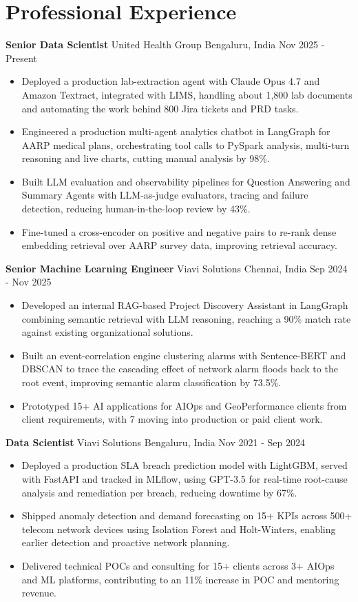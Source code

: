 \documentclass[10pt,a4paper]{article}
\newcommand{\role}[4]{\textbf{#1} \textbar{} #2 \hfill #3 \textbar{} #4\par}
\begin{document}
\section{Professional Experience}
\role{Senior Data Scientist}{United Health Group}{Bengaluru, India}{Nov 2025 - Present}
\begin{itemize}
  \item Deployed a production lab-extraction agent with Claude Opus 4.7 and Amazon Textract, integrated with LIMS, handling about 1,800 lab documents and automating the work behind 800 Jira tickets and PRD tasks.
  \item Engineered a production multi-agent analytics chatbot in LangGraph for AARP medical plans, orchestrating tool calls to PySpark analysis, multi-turn reasoning and live charts, cutting manual analysis by 98\%.
  \item Built LLM evaluation and observability pipelines for Question Answering and Summary Agents with LLM-as-judge evaluators, tracing and failure detection, reducing human-in-the-loop review by 43\%.
  \item Fine-tuned a cross-encoder on positive and negative pairs to re-rank dense embedding retrieval over AARP survey data, improving retrieval accuracy.
\end{itemize}
\vspace{3pt}
\role{Senior Machine Learning Engineer}{Viavi Solutions}{Chennai, India}{Sep 2024 - Nov 2025}
\begin{itemize}
  \item Developed an internal RAG-based Project Discovery Assistant in LangGraph combining semantic retrieval with LLM reasoning, reaching a 90\% match rate against existing organizational solutions.
  \item Built an event-correlation engine clustering alarms with Sentence-BERT and DBSCAN to trace the cascading effect of network alarm floods back to the root event, improving semantic alarm classification by 73.5\%.
  \item Prototyped 15+ AI applications for AIOps and GeoPerformance clients from client requirements, with 7 moving into production or paid client work.
\end{itemize}
\vspace{3pt}
\role{Data Scientist}{Viavi Solutions}{Bengaluru, India}{Nov 2021 - Sep 2024}
\begin{itemize}
  \item Deployed a production SLA breach prediction model with LightGBM, served with FastAPI and tracked in MLflow, using GPT-3.5 for real-time root-cause analysis and remediation per breach, reducing downtime by 67\%.
  \item Shipped anomaly detection and demand forecasting on 15+ KPIs across 500+ telecom network devices using Isolation Forest and Holt-Winters, enabling earlier detection and proactive network planning.
  \item Delivered technical POCs and consulting for 15+ clients across 3+ AIOps and ML platforms, contributing to an 11\% increase in POC and mentoring revenue.
\end{itemize}
\end{document}
